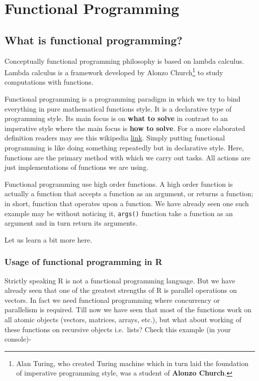 \documentclass[
]{book}
\begin{document}
\hypertarget{functional-programming}{%
\chapter{Functional Programming}\label{functional-programming}}

\hypertarget{what-is-functional-programming}{%
\section{What is functional programming?}\label{what-is-functional-programming}}

Conceptually functional programming philosophy is based on lambda calculus. Lambda calculus is a framework developed by Alonzo Church\footnote{Alan Turing, who created Turing machine which in turn laid the foundation of imperative programming style, was a student of \textbf{Alonzo Church}.} to study computations with functions.

Functional programming is a programming paradigm in which we try to bind everything in pure mathematical functions style. It is a declarative type of programming style. Its main focus is on \textbf{what to solve} in contrast to an imperative style where the main focus is \textbf{how to solve}. For a more elaborated definition readers may see this wikipedia \href{https://en.wikipedia.org/wiki/Functional_programming}{link}. Simply putting functional programming is like doing something repeatedly but in declarative style. Here, functions are the primary method with which we carry out tasks. All actions are just implementations of functions we are using.

Functional programming use high order functions. A high order function is actually a function that accepts a function as an argument, or returns a function; in short, function that operates upon a function. We have already seen one such example may be without noticing it, \texttt{args()} function take a function as an argument and in turn return its arguments.

Let us learn a bit more here.

\hypertarget{usage-of-functional-programming-in-r}{%
\subsection{Usage of functional programming in R}\label{usage-of-functional-programming-in-r}}

Strictly speaking R is not a functional programming language. But we have already seen that one of the greatest strengths of R is parallel operations on vectors. In fact we need functional programming where concurrency or parallelism is required. Till now we have seen that most of the functions work on all atomic objects (vectors, matrices, arrays, etc.), but what about working of these functions on recursive objects i.e.~lists? Check this example (in your console)-
\end{document}
